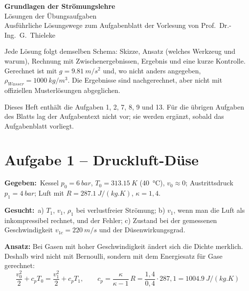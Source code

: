 \documentclass[11pt,a4paper]{article}
\newcommand{\gegeben}{\textbf{Gegeben:}\ }
\newcommand{\gesucht}{\textbf{Gesucht:}\ }
\begin{document}
\begin{center}
{\sffamily\bfseries\huge\color{acc} Grundlagen der Strömungslehre}\\[4pt]
{\sffamily\Large Lösungen der Übungsaufgaben}\\[6pt]
{\small Ausführliche Lösungswege zum Aufgabenblatt der Vorlesung von Prof.\ Dr.-Ing.\ G.\ Thieleke}
\end{center}

\vspace{4pt}
Jede Lösung folgt demselben Schema: Skizze, Ansatz (welches Werkzeug und warum), Rechnung mit Zwischenergebnissen, Ergebnis und eine kurze Kontrolle. Gerechnet ist mit $g = \SI{9.81}{m/s^2}$ und, wo nicht anders angegeben, $\rho_{Wasser} = \SI{1000}{kg/m^3}$. Die Ergebnisse sind nachgerechnet, aber nicht mit offiziellen Musterlösungen abgeglichen.

\begin{merke}[Umfang]
Dieses Heft enthält die Aufgaben 1, 2, 7, 8, 9 und 13. Für die übrigen Aufgaben des Blatts lag der Aufgabentext nicht vor; sie werden ergänzt, sobald das Aufgabenblatt vorliegt.
\end{merke}

\tableofcontents

\section{Aufgabe 1 -- Druckluft-Düse}

\begin{bild}

\end{bild}

\gegeben Kessel $p_0 = \SI{6}{bar}$, $T_0 = \SI{313.15}{K}$ (\SI{40}{\celsius}), $v_0 \approx 0$; Austrittsdruck $p_1 = \SI{4}{bar}$; Luft mit $R = \SI{287.1}{J/(kg.K)}$, $\kappa = 1{,}4$.

\gesucht a) $T_1$, $v_1$, $\rho_1$ bei verlustfreier Strömung; b) $v_1$, wenn man die Luft als inkompressibel rechnet, und der Fehler; c) Zustand bei der gemessenen Geschwindigkeit $v_{1c} = \SI{220}{m/s}$ und der Düsenwirkungsgrad.

\textbf{Ansatz:} Bei Gasen mit hoher Geschwindigkeit ändert sich die Dichte merklich. Deshalb wird nicht mit Bernoulli, sondern mit dem Energiesatz für Gase gerechnet:
\[
\frac{v_0^2}{2} + c_p T_0 = \frac{v_1^2}{2} + c_p T_1,
\qquad
c_p = \frac{\kappa}{\kappa - 1}\,R = \frac{1{,}4}{0{,}4}\cdot 287{,}1 = \SI{1004.9}{J/(kg.K)}
\]
\end{document}
